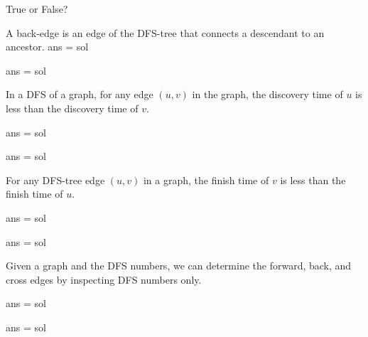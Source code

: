 \begin{problem}[DFS]
True or False? 

\asktf[a)]
A back-edge is an edge of the DFS-tree that connects a descendant to
an ancestor.
\solf
\algoc 
ans = sol

\algog

ans = sol


\asktf[b)] 

In a DFS of a graph, for any edge $(u,v)$ in the graph, the discovery
time of $u$ is less than the discovery time of $v$.  

\solf

\algoc 
ans = sol

\algog
ans = sol
 


\asktf[c)]
For any DFS-tree edge $(u,v)$ in a graph, the finish time of $v$ is
less than the finish time of $u$.  
\solt

\algoc 
ans = sol

\algog

ans = sol


\asktf[d)] 
Given a graph and the DFS numbers, we can determine the
forward, back, and cross edges by inspecting DFS numbers only.  
\solt

\algoc 
ans = sol

\algog

ans = sol






 

\end{problem}


